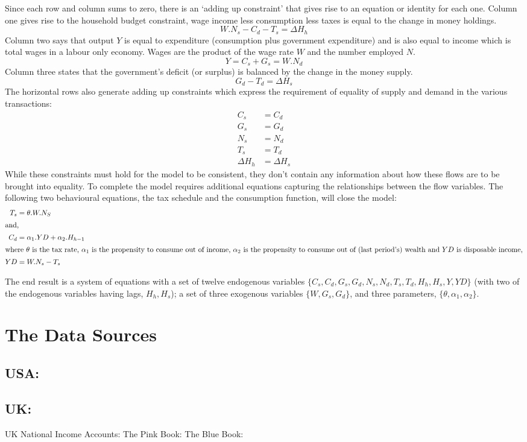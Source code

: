 \documentclass[twoside,a4paper,11pt]{article}
\begin{document}
Since each row and column sums to zero, there is an \lq adding up constraint' that gives rise to an equation or identity for each one. Column one gives rise to the household budget constraint, wage income less consumption less taxes is equal to the change in money holdings.
$$W.N_s - C_d -T_s = \Delta H_h$$
Column two says that output $Y$ is equal to expenditure (consumption plus government expenditure) and is also equal to income which is  total wages in a labour only economy. Wages are the product of the wage rate $W$ and the number employed $N$.
$$Y = C_s + G_s = W.N_d$$
Column three states that the government's deficit (or surplus) is balanced by the change in the money supply.
$$ G_d -T_d = \Delta H_s $$
The horizontal rows also generate adding up constraints which express the requirement of equality of supply and demand in the various transactions:
\begin{align*}
C_s & = C_d\\
G_s & = G_d\\
N_s & = N_d\\
T_s & = T_d\\
\Delta H_h & = \Delta H_s
\end{align*}
While these constraints must hold for the model to be consistent, they don't contain any information about how these flows are to be brought into equality. To complete the model requires additional equations capturing the relationships between the flow variables. The following two behavioural equations, the tax schedule and the consumption function, will close the model:
\begin{align*}
T_s & = \theta.W.N_S\\
\intertext{and,}
C_d & = \alpha_1.YD + \alpha_2.H_{h-1}\\
\intertext{where $\theta$ is the tax rate, $\alpha_1$ is the propensity to consume out of income, $\alpha_2$ is the propensity to consume out of (last period's) wealth and $YD$ is disposable income,}
YD & = W.N_s -T_s
\end{align*}

The end result is a system of equations with a set of twelve endogenous variables
$\{C_s, C_d, G_s, G_d, N_s, N_d, T_s, T_d, H_h, H_s, Y, YD\}$ (with two of the endogenous variables having lags, $H_h, H_s$); a set of three exogenous variables $\{W, G_s, G_d\}$, 
and three parameters, $\{\theta, \alpha_1, \alpha_2 \}$.

\section{The Data Sources}
\subsection{USA:}

\subsection{UK:}
UK National Income Accounts:
The Pink Book:
The Blue Book:




\end{document}
